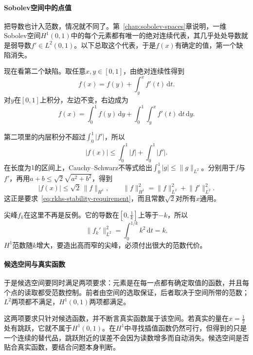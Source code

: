 \paragraph{Sobolev空间中的点值}

把导数也计入范数，情况就不同了。第~\ref{chap:sobolev-spaces}章说明，一维Sobolev空间$H^1(0,1)$中的每个元素都有唯一的绝对连续代表，其几乎处处导数就是弱导数$f'\in L^2(0,1)$。以下总取这个代表，于是$f(x)$有确定的值，第一个缺陷消失。

现在看第二个缺陷。取任意$x,y\in[0,1]$，由绝对连续性得到
\[
f(x)=f(y)+\int_y^xf'(t)\,\mathrm dt .
\]
对$y$在$[0,1]$上积分，左边不变，右边成为
\[
f(x)=\int_0^1f(y)\,\mathrm dy+\int_0^1\!\!\int_y^xf'(t)\,\mathrm dt\,\mathrm dy .
\]

第二项里的内层积分不超过$\int_0^1\lvert f'\rvert$，所以
\[
\lvert f(x)\rvert\leq\int_0^1\lvert f\rvert+\int_0^1\lvert f'\rvert .
\]
在长度为$1$的区间上，Cauchy--Schwarz不等式给出$\int_0^1\lvert g\rvert\leq\lVert g\rVert_{L^2}$。分别用于$f$与$f'$，再用$a+b\leq\sqrt2\sqrt{a^2+b^2}$，得到
\begin{equation}
\lvert f(x)\rvert\leq\sqrt2\,\lVert f\rVert_{H^1},\qquad
\lVert f\rVert_{H^1}^2=\lVert f\rVert_{L^2}^2+\lVert f'\rVert_{L^2}^2 .
\label{eq:rkhs-h1-point-bound}
\end{equation}
这正是要求~\eqref{eq:rkhs-stability-requirement}，而且常数$\sqrt2$对所有$x$通用。

尖峰$f_k$在这里不再是反例。它的导数在$[0,\tfrac1k]$上等于$-k$，所以
\[
\lVert f_k'\rVert_{L^2}^2=\int_0^{1/k}k^2\,\mathrm dt=k .
\]
$H^1$范数随$k$增大，要造出高而窄的尖峰，必须付出很大的范数代价。

\paragraph{候选空间与真实函数}

于是候选空间要同时满足两项要求：元素是在每一点都有确定取值的函数，并且每个点的读取都受范数控制。前者由空间的选取保证，后者取决于空间所带的范数；$L^2$两项都不满足，$H^1(0,1)$两项都满足。

这两项要求只针对候选函数，并不断言真实函数属于该空间。若真实的量在$x=\tfrac12$处有跳跃，它就不属于$H^1(0,1)$。在$H^1$中寻找插值函数仍然可行，但得到的只是一个连续的替代品，跳跃附近的误差不会因为读数增多而自动消失。候选空间是否贴合真实函数，要结合问题本身判断。
